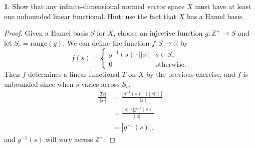 \documentclass[12pt]{article}
\theoremstyle{definition}
\newtheorem{ex}{}
\begin{document}
\begin{ex}
	Show that any infinite-dimensional normed vector space $X$ must have at least one unbounded linear functional.
	Hint: use the fact that $X$ has a Hamel basis.
\end{ex}
\begin{proof}
	Given a Hamel basis $S$ for $X$, choose an injective function $g : \mathbb{Z}^+ \to S$ and let $S_c = \text{range}(g)$.
	We can define the function $f : S \to \mathbb{R}$ by \begin{equation*}
		f(s) = \begin{cases}
			g^{-1}(s)\cdot||s|| & s \in S_c         \\
			0                   & \text{otherwise}.
		\end{cases}
	\end{equation*}
	Then $f$ determines a linear functional $T$ on $X$ by the previous exercise, and $f$ is unbounded since when $s$ varies across $S_c$, \begin{align*}
		\frac{|Ts|}{||s||} & = \frac{|g^{-1}(s)\cdot(||s||) |}{||s||} \\
		                   & = \frac{||s|| \cdot |g^{-1}(s)|}{||s||}  \\
		                   & = |g^{-1}(s)|,
	\end{align*}
	and $g^{-1}(s)$ will vary across $\mathbb{Z}^+$.
\end{proof}
\end{document}
